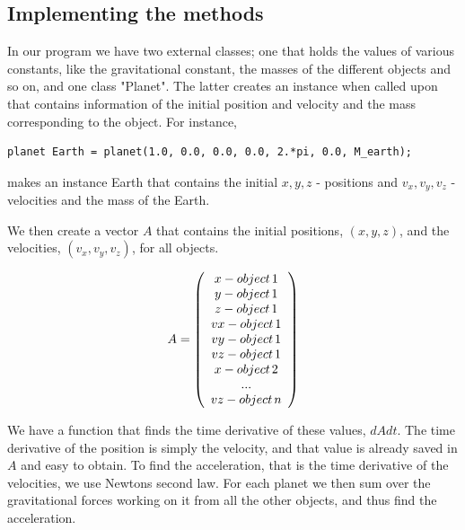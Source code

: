 \documentclass[a4paper,12pt, english]{article}
\begin{document}
\subsection*{Implementing the methods}
In our program we have two external classes; one that holds the values of various constants, like the gravitational constant, the masses of the different objects and so on, and one class "Planet". The latter creates an instance when called upon that contains information of the initial position and velocity and the mass corresponding to the object. For instance, 

\begin{lstlisting}[title={Making of instance}]
planet Earth = planet(1.0, 0.0, 0.0, 0.0, 2.*pi, 0.0, M_earth);
\end{lstlisting} 

makes an instance Earth that contains the initial $x, y, z$ - positions and $v_x, v_y, v_z$ - velocities and the mass of the Earth.

We then create a vector $A$ that contains the initial positions, $(x,y,z)$, and the velocities, $(v_x,v_y,v_z)$, for all objects.

\[ A = \left( \begin{array}{c}
x - object \hspace*{0.5mm} 1\\
y - object \hspace*{0.5mm} 1\\
z - object \hspace*{0.5mm} 1 \\
vx - object \hspace*{0.5mm} 1\\
vy -object \hspace*{0.5mm}  1\\
vz - object \hspace*{0.5mm} 1 \\
x - object \hspace*{0.5mm} 2\\
... \\
vz - object \hspace*{0.5mm} n \end{array} \right)\]    

We have a function that finds the time derivative of these values, $dAdt$. The time derivative of the position is simply the velocity, and that value is already saved in $A$ and easy to obtain. To find the acceleration, that is the time derivative of the velocities, we use Newtons second law. For each planet we then sum over the gravitational forces working on it from all the other objects, and thus find the acceleration. 
\end{document}
